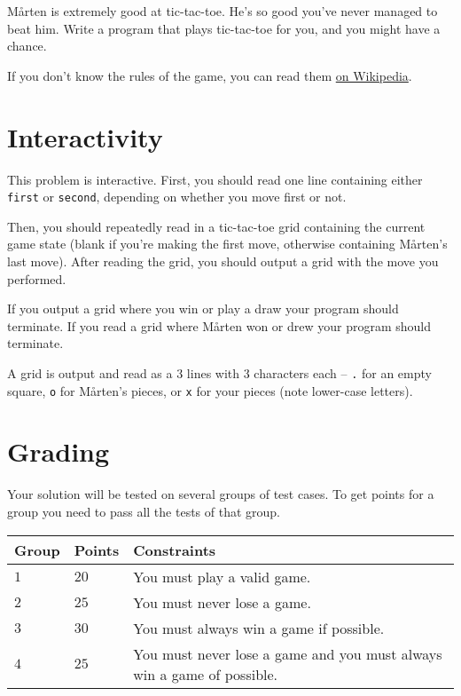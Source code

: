 Mårten is extremely good at tic-tac-toe.
He's so good you've never managed to beat him.
Write a program that plays tic-tac-toe for you, and you might have a chance.

If you don't know the rules of the game, you can read them \href{https://en.wikipedia.org/wiki/Tic\_tac\_toe}{on Wikipedia}.

\section*{Interactivity}
This problem is interactive.
First, you should read one line containing either \texttt{first} or \texttt{second}, depending on whether you move first or not.

Then, you should repeatedly read in a tic-tac-toe grid containing the current game state (blank if you're making the first move, otherwise containing Mårten's last move).
After reading the grid, you should output a grid with the move you performed.

If you output a grid where you win or play a draw your program should terminate.
If you read a grid where Mårten won or drew your program should terminate.

A grid is output and read as a 3 lines with 3 characters each -- \texttt{.} for an empty square, \texttt{o} for Mårten's pieces, or \texttt{x} for your pieces (note lower-case letters).

\section*{Grading}
Your solution will be tested on several groups of test cases. To get points for a group you need to pass all the tests of that group.

\noindent
\begin{tabular}{| l | l | l |}
	\hline
	Group & Points & Constraints\\ \hline
 $1$    & $20$        & You must play a valid game. \\ \hline
 $2$    & $25$        & You must never lose a game. \\ \hline
 $3$    & $30$        & You must always win a game if possible. \\ \hline
 $4$    & $25$        & You must never lose a game and you must always win a game of possible. \\ \hline
\end{tabular}
